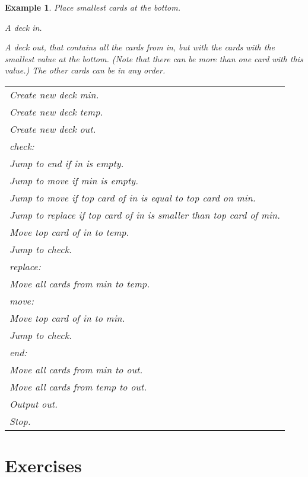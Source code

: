 \documentclass[a4paper,twoside]{tufte-handout}
\newtheorem{example}{Example}
\newcommand\lbl[1]{\hspace{-1em}\emph{#1:}}
\begin{document}
\begin{example}\label{smallbottom}
  Place smallest cards at the bottom.
  \begin{description}
  \item[Input:] A deck \emph{in}.
  \item[Output:] A deck \emph{out}, that contains all the cards from
    in, but with the cards with the smallest value at the
    bottom. (Note that there can be more than one card with this
    value.) The other cards can be in any order.
 \item[Algorithm:]
  \item\normalfont
    \begin{tabular}{l}
      Create new deck \emph{min}.\\
      Create new deck \emph{temp}.\\
      Create new deck \emph{out}.\\
      \lbl{check}\\
      Jump to \emph{end} if \emph{in} is empty.\\
      Jump to \emph{move} if \emph{min} is empty.\\
      Jump to \emph{move} if top card of \emph{in} is equal to
      top card on \emph{min}.\\
      Jump to \emph{replace} if top card of \emph{in} is smaller than
      top card of \emph{min}.\\
      Move top card of \emph{in} to \emph{temp}.\\
      Jump to \emph{check}.\\
      \lbl{replace}\\
      Move all cards from \emph{min} to \emph{temp}.\\
      \lbl{move}\\
      Move top card of \emph{in} to \emph{min}.\\
      Jump to \emph{check}.\\
      \lbl{end}\\
      Move all cards from \emph{min} to \emph{out}.\\
      Move all cards from \emph{temp} to \emph{out}.\\
      Output \emph{out}.\\
      Stop.
    \end{tabular}
  \end{description}
\end{example}

\section{Exercises}\label{sec-exer}
\end{document}
